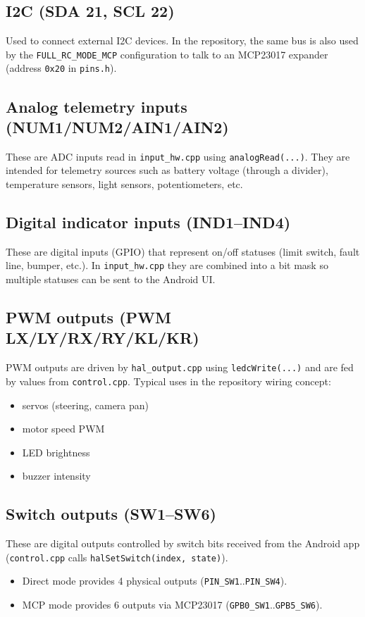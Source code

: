 \subsection{I2C (SDA 21, SCL 22)}
Used to connect external I2C devices. In the repository, the same bus is also used by the
\texttt{FULL\_RC\_MODE\_MCP} configuration to talk to an MCP23017 expander (address \texttt{0x20} in \texttt{pins.h}).

\subsection{Analog telemetry inputs (NUM1/NUM2/AIN1/AIN2)}
These are ADC inputs read in \texttt{input\_hw.cpp} using \texttt{analogRead(...)}.
They are intended for telemetry sources such as battery voltage (through a divider), temperature sensors, light sensors,
potentiometers, etc.

\subsection{Digital indicator inputs (IND1--IND4)}
These are digital inputs (GPIO) that represent on/off statuses (limit switch, fault line, bumper, etc.).
In \texttt{input\_hw.cpp} they are combined into a bit mask so multiple statuses can be sent to the Android UI.

\subsection{PWM outputs (PWM LX/LY/RX/RY/KL/KR)}
PWM outputs are driven by \texttt{hal\_output.cpp} using \texttt{ledcWrite(...)} and are fed by values from
\texttt{control.cpp}.
Typical uses in the repository wiring concept:
\begin{itemize}
    \item servos (steering, camera pan)
    \item motor speed PWM
    \item LED brightness
    \item buzzer intensity
\end{itemize}

\subsection{Switch outputs (SW1--SW6)}
These are digital outputs controlled by switch bits received from the Android app (\texttt{control.cpp} calls
\texttt{halSetSwitch(index, state)}).
\begin{itemize}
    \item Direct mode provides 4 physical outputs (\texttt{PIN\_SW1}..\texttt{PIN\_SW4}).
    \item MCP mode provides 6 outputs via MCP23017 (\texttt{GPB0\_SW1}..\texttt{GPB5\_SW6}).
\end{itemize}

